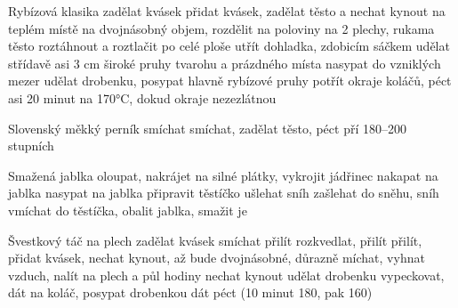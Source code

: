 \documentclass[12pt,a4paper]{article}
\begin{document}
\begin{recipe}{Rybízová klasika}
   zadělat kvásek
   přidat kvásek, zadělat těsto a nechat kynout na teplém místě na dvojnásobný objem, rozdělit na poloviny na 2 plechy, rukama těsto roztáhnout a roztlačit po celé ploše
   utřít dohladka, zdobicím sáčkem udělat střídavě asi 3 cm široké pruhy tvarohu a prázdného místa
   nasypat do vzniklých mezer
   udělat drobenku, posypat hlavně rybízové pruhy
   potřít okraje koláčů, péct asi 20 minut na 170°C, dokud okraje nezezlátnou
\end{recipe}
\newpage

\begin{recipe}{Slovenský měkký perník}
   smíchat
   smíchat, zadělat těsto, péct pří 180--200 stupních
\end{recipe}
\newpage

\begin{recipe}{Smažená jablka}
   oloupat, nakrájet na silné plátky, vykrojit jádřinec
   nakapat na jablka
   nasypat na jablka
   připravit těstíčko
   ušlehat sníh
   zašlehat do sněhu, sníh vmíchat do těstíčka, obalit jablka, smažit je
\end{recipe}
\newpage

\begin{recipe}{Švestkový táč na plech}
   zadělat kvásek
   smíchat
   přilít
   rozkvedlat, přilít
   přilít, přidat kvásek, nechat kynout, až bude dvoj\-ná\-sob\-né,
    důrazně míchat, vyhnat vzduch, nalít na plech a půl hodiny nechat kynout 
   udělat drobenku
   vypeckovat, dát na koláč, posypat drobenkou dát péct (10 minut 180, pak 160)
\end{recipe}
\newpage
\end{document}
